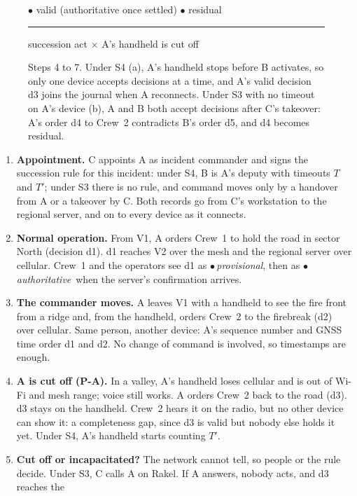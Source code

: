 \documentclass[11pt,a4paper]{article}
\newcommand{\status}[2]{\textcolor{#1}{$\bullet$}\,\textit{#2}}
\newcommand{\sAuth}{\status{good}{authoritative}}
\newcommand{\sProv}{\status{prov}{provisional}}
\begin{document}
\begin{figure}[htbp]
\vspace{3pt}
{\scriptsize \textcolor{good}{$\bullet$} valid (authoritative once settled)\quad
\textcolor{resid}{$\bullet$} residual\quad
\textcolor{accent}{\rule[.5ex]{1.2em}{1pt}} succession act\quad
\textcolor{warn}{$\times$} A's handheld is cut off}
\caption{Steps 4 to 7. Under S4 (a), A's handheld stops before B activates, so only one
device accepts decisions at a time, and A's valid decision d3 joins the journal when A
reconnects. Under S3 with no timeout on A's device (b), A and B both accept decisions after
C's takeover: A's order d4 to Crew~2 contradicts B's order d5, and d4 becomes residual.}
\label{fig:timeline}
\end{figure}

\begin{enumerate}[label=\textbf{\arabic*.}, leftmargin=1.6em]
  \item \textbf{Appointment.} C appoints A as incident commander and signs the succession
        rule for this incident: under S4, B is A's deputy with timeouts $T$ and $T'$; under
        S3 there is no rule, and command moves only by a handover from A or a takeover by C.
        Both records go from C's workstation to the regional server, and on to every device
        as it connects.
  \item \textbf{Normal operation.} From V1, A orders Crew~1 to hold the road in sector North
        (decision d1). d1
        reaches V2 over the mesh and the regional server over cellular. Crew~1 and the
        operators see d1 as \sProv, then as \sAuth\ when the server's confirmation arrives.
  \item \textbf{The commander moves.} A leaves V1 with a handheld to see the fire front from a
        ridge and, from the handheld, orders Crew~2 to the firebreak (d2) over cellular. Same
        person, another device: A's sequence number and GNSS time order d1 and d2. No change
        of command is involved, so timestamps are enough.
  \item \textbf{A is cut off (P-A).} In a valley, A's handheld loses cellular and is out of
        Wi-Fi and mesh range; voice still works. A orders Crew~2 back to the road (d3). d3
        stays on the handheld. Crew~2 hears it on the radio, but no other device can show
        it: a completeness gap, since d3 is valid but nobody else holds it yet. Under S4, A's
        handheld starts counting $T'$.
  \item \textbf{Cut off or incapacitated?} The network cannot tell, so people or the rule
        decide. Under S3, C calls A on Rakel. If A answers, nobody acts, and d3 reaches the

\end{enumerate}
\end{document}
